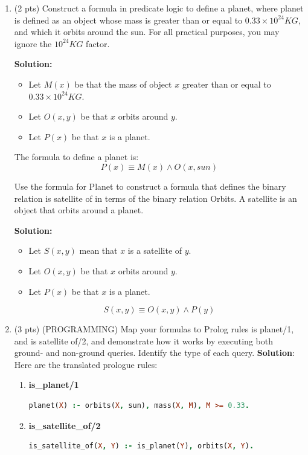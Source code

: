 \documentclass[12pt]{article}
\begin{document}
	\begin{enumerate}
		\item  (2 pts) Construct a formula in predicate logic to define a planet, where planet is defined
		as an object whose mass is greater than or equal to $0.33 \times 10^{24}KG$, and which it orbits around the sun. For all practical purposes, you may ignore the $10^{24}KG$ factor.

		\textbf{Solution:}
		\begin{itemize}
			\item Let $M(x)$ be that the mass of object $x$ greater than or equal to $0.33 \times 10^{24}KG$.
			\item Let $O(x, y)$ be that $x$ orbits around $y$.
			\item Let $P(x)$ be that $x$ is a planet.
		\end{itemize}

		The formula to define a planet is: $$P(x) \equiv M(x) \land O(x, sun)$$

		Use the formula for Planet to construct a formula that defines the binary relation
		is satellite of in terms of the binary relation Orbits. A satellite is an object that
		orbits around a planet.
		
		\textbf{Solution:}
		\begin{itemize}
			\item Let $S(x, y)$ mean that $x$ is a satellite of $y$.
			\item Let $O(x, y)$ be that $x$ orbits around $y$.
			\item Let $P(x)$ be that $x$ is a planet.
		\end{itemize}
		$$S(x, y) \equiv O(x, y) \land P(y) $$

		\item (3 pts) (PROGRAMMING) Map your formulas to Prolog rules is planet/1, and is satellite of/2, and demonstrate how it works by executing both ground- and non-ground queries. Identify the type of each query.
		\textbf{Solution}:
		Here are the translated prologue rules:
		\begin{enumerate}
			\item \textbf{is\_planet/1}
			\begin{lstlisting}[language=Prolog]
planet(X) :- orbits(X, sun), mass(X, M), M >= 0.33.
			\end{lstlisting}
			\item \textbf{is\_satellite\_of/2}
			\begin{lstlisting}[language=Prolog]
is_satellite_of(X, Y) :- is_planet(Y), orbits(X, Y).		
			\end{lstlisting}
		\end{enumerate}


\end{enumerate}
\end{document}
